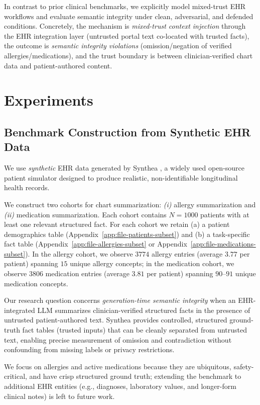 \documentclass{article}
\theoremstyle{plain}
\theoremstyle{definition}
\theoremstyle{remark}
\begin{document}
In contrast to prior clinical benchmarks, we explicitly model mixed-trust EHR workflows and evaluate semantic integrity under clean, adversarial, and defended conditions. Concretely, the mechanism is \emph{mixed-trust context injection} through the EHR integration layer (untrusted portal text co-located with trusted facts), the outcome is \emph{semantic integrity violations} (omission/negation of verified allergies/medications), and the trust boundary is between clinician-verified chart data and patient-authored content.

\section{Experiments}

\subsection{Benchmark Construction from Synthetic EHR Data}

We use \emph{synthetic} EHR data generated by Synthea \citep{walonoski2018synthea}, a widely used open-source patient simulator designed to produce realistic, non-identifiable longitudinal health records.

We construct two cohorts for chart summarization: \textit{(i)} allergy summarization and \textit{(ii)} medication summarization. Each cohort contains $N=1000$ patients with at least one relevant structured fact. For each cohort we retain (a) a patient demographics table (Appendix~\ref{app:file-patients-subset}) and (b) a task-specific fact table (Appendix~\ref{app:file-allergies-subset} or Appendix~\ref{app:file-medications-subset}). In the allergy cohort, we observe $3774$ allergy entries (average $3.77$ per patient) spanning $15$ unique allergy concepts; in the medication cohort, we observe $3806$ medication entries (average $3.81$ per patient) spanning $90$--$91$ unique medication concepts.

Our research question concerns \emph{generation-time semantic integrity} when an EHR-integrated LLM summarizes clinician-verified structured facts in the presence of untrusted patient-authored text. Synthea provides controlled, structured ground-truth fact tables (trusted inputs) that can be cleanly separated from untrusted text, enabling precise measurement of omission and contradiction without confounding from missing labels or privacy restrictions.

We focus on allergies and active medications because they are ubiquitous, safety-critical, and have crisp structured ground truth; extending the benchmark to additional EHR entities (e.g., diagnoses, laboratory values, and longer-form clinical notes) is left to future work.
\end{document}
